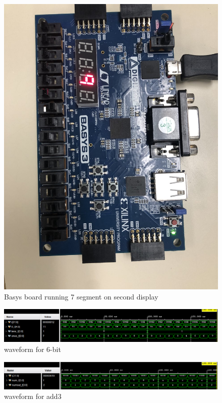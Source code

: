 \documentclass[11pt]{article}
\begin{document}
\begin{figure}
	\includegraphics[width= \textwidth]{basys2.png}
	\caption{Basys board running 7 segment on second display }\label{fig:Basys2}
\end{figure}
\begin{figure}
	\includegraphics[width= \textwidth]{dd6bsc.png}
	\caption{waveform for 6-bit}\label{fig:dd6b}
\end{figure}
\begin{figure}
	\includegraphics[width= \textwidth]{add3sc.png}
	\caption{waveform for add3}\label{fig:add3}
\end{figure}
\end{document}
